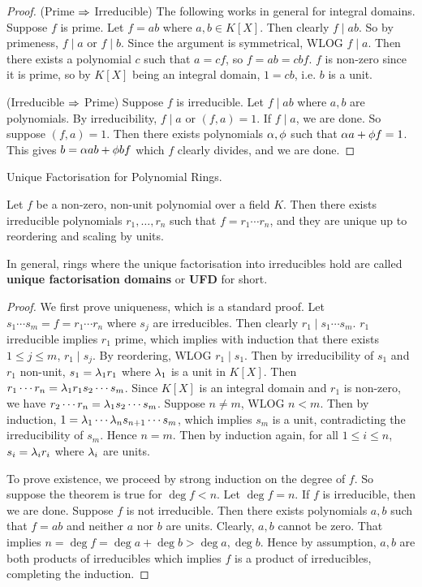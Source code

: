 \documentclass[../book.tex]{subfiles}
\begin{document}
\begin{proof}
    (Prime $\Rightarrow$ Irreducible)
    The following works in general for integral domains. 
    Suppose $f$ is prime. Let $f = ab$ where $a, b \in K[X]$. 
    Then clearly $f \mid ab$. 
    So by primeness, $f \mid a$ or $f \mid b$. 
    Since the argument is symmetrical, WLOG $f \mid a$. 
    Then there exists a polynomial $c$ such that $a = cf$,
    so $f = ab = cbf$. 
    $f$ is non-zero since it is prime, so by $K[X]$ being an integral domain,
    $1 = cb$, i.e. $b$ is a unit. 
    
    (Irreducible $\Rightarrow$ Prime)
    Suppose $f$ is irreducible. Let $f \mid ab$ where $a, b$ are polynomials. 
    By irreducibility, $f \mid a$ or $(f, a) = 1$.
    If $f \mid a$, we are done. 
    So suppose $(f, a) = 1$. 
    Then there exists polynomials $\alpha, \phi$ such that $\alpha a + \phi f = 1$.
    This gives $b = \alpha a b + \phi b f$ which $f$ clearly divides, and we are done.
\end{proof}
\begin{thm} Unique Factorisation for Polynomial Rings.
    
    Let $f$ be a non-zero, non-unit polynomial over a field $K$.
    Then there exists irreducible polynomials $r_1, \dots, r_n$ such that
    $f = r_1\cdots r_n$, and they are unique up to reordering and scaling by units.
    
    In general, rings where the unique factorisation into irreducibles hold
    are called \textbf{unique factorisation domains} or \textbf{UFD} for short.
\end{thm}
\begin{proof}
    We first prove uniqueness, which is a standard proof.
    Let $s_1 \cdots s_m = f = r_1 \cdots r_n$ where $s_j$ are irreducibles.
    Then clearly $r_1 \mid s_1 \cdots s_m$. 
    $r_1$ irreducible implies $r_1$ prime, which implies with induction that
    there exists $1 \leq j \leq m$, $r_1 \mid s_j$. 
    By reordering, WLOG $r_1 \mid s_1$. 
    Then by irreducibility of $s_1$ and $r_1$ non-unit, 
    $s_1 = \lambda_1 r_1$ where $\lambda_1$ is a unit in $K[X]$. 
    Then $r_1 \cdots r_n = \lambda_1 r_1 s_2 \cdots s_m$. 
    Since $K[X]$ is an integral domain and $r_1$ is non-zero, 
    we have $r_2 \cdots r_n = \lambda_1 s_2 \cdots s_m$. 
    Suppose $n \neq m$, WLOG $n < m$. 
    Then by induction, $1 = \lambda_1 \cdots \lambda_n s_{n+1} \cdots s_m$,
    which implies $s_m$ is a unit, contradicting the irreducibility of $s_m$.
    Hence $n = m$. Then by induction again, for all $1\leq i \leq n$,
    $s_i = \lambda_i r_i$ where $\lambda_i$ are units. 
    
    To prove existence, we proceed by strong induction on the degree of $f$. 
    So suppose the theorem is true for $\deg f < n$. 
    Let $\deg f = n$. 
    If $f$ is irreducible, then we are done. 
    Suppose $f$ is not irreducible. 
    Then there exists polynomials $a, b$ such that $f = ab$ and 
    neither $a$ nor $b$ are units. 
    Clearly, $a, b$ cannot be zero. 
    That implies $n = \deg f = \deg a + \deg b > \deg a, \deg b$. 
    Hence by assumption, $a, b$ are both products of irreducibles
    which implies $f$ is a product of irreducibles, completing the induction. 
\end{proof}
\end{document}
